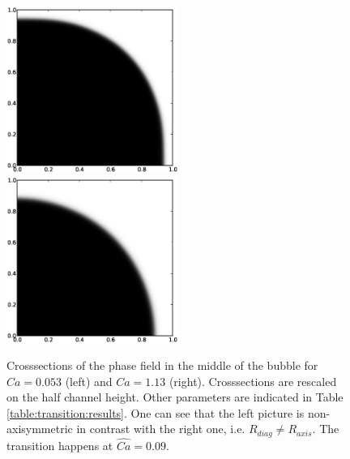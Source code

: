 \documentclass[preprint,12pt]{elsarticle}
\begin{document}
\begin{figure}[ht]
\includegraphics[width=0.5\textwidth]{Figures/phase_crossection_ca5.eps}
\includegraphics[width=0.5\textwidth]{Figures/phase_crossection_ca13.eps}\\
\caption{Crosssections of the phase field in the middle of the bubble for $Ca=0.053$
(left) and $Ca=1.13$ (right). Crosssections are rescaled on the half channel height. Other
parameters are indicated in Table \ref{table:transition:results}. One can see that the left picture
is non-axisymmetric in contrast
with the right one, i.e. $R_{diag}\neq R_{axis}$. The transition happens at
$\widehat{Ca}=0.09$.\label{fig:crosssections:sym}}
\end{figure}
\end{document}
